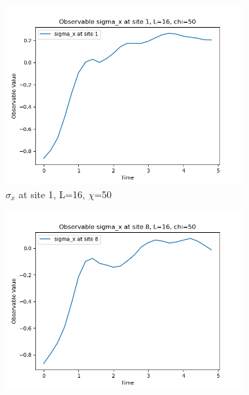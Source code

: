 \documentclass[12pt]{article}
\begin{document}
\begin{figure}[h!]
  \centering
  \begin{subfigure}[b]{0.48\textwidth}
    \centering
    \includegraphics[width=\textwidth]{observable_sigma_x_site_1_L_16_chi_50.png}
    \caption{$\sigma_x$ at site 1, L=16, $\chi$=50}
  \end{subfigure}
  \hfill
  \begin{subfigure}[b]{0.48\textwidth}
    \centering
    \includegraphics[width=\textwidth]{observable_sigma_x_site_8_L_16_chi_50.png}
  \end{subfigure}
  

\end{figure}
\end{document}

